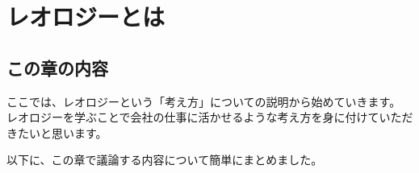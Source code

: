 \documentclass[uplatex,dvipdfmx,a4paper,11pt]{jsreport}
\begin{document}

\chapter{レオロジーとは}

\section*{この章の内容}

ここでは、レオロジーという「考え方」についての説明から始めていきます。
レオロジーを学ぶことで会社の仕事に活かせるような考え方を身に付けていただきたいと思います。

以下に、この章で議論する内容について簡単にまとめました。
\end{document}
